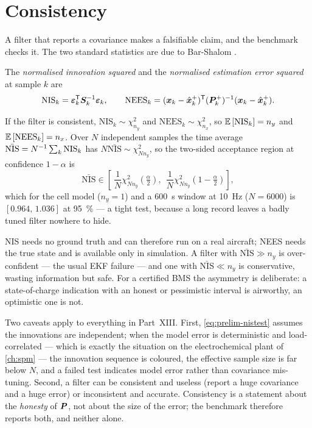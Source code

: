 \section{Consistency}
\label{sec:prelim-consistency}

A filter that reports a covariance makes a falsifiable claim, and the benchmark checks it. The
two standard statistics are due to Bar-Shalom \cite[\S 5.4]{barshalom2001}.

\begin{definition}\label{def:prelim-nis}
The \emph{normalised innovation squared} and the \emph{normalised estimation error squared} at
sample $k$ are
\begin{equation}
\mathrm{NIS}_k = \bm{\varepsilon}_k^{\mathsf{T}}\bm{S}_k^{-1}\bm{\varepsilon}_k, \qquad
\mathrm{NEES}_k = (\bm{x}_k-\hat{\bm{x}}^{+}_k)^{\mathsf{T}}(\bm{P}^{+}_k)^{-1}(\bm{x}_k-\hat{\bm{x}}^{+}_k).
\label{eq:prelim-nisnees}
\end{equation}
\end{definition}

If the filter is consistent, $\mathrm{NIS}_k\sim\chi^2_{n_y}$ and
$\mathrm{NEES}_k\sim\chi^2_{n_x}$, so $\mathbb{E}\left[\mathrm{NIS}_k\right]=n_y$ and $\mathbb{E}\left[\mathrm{NEES}_k\right]=n_x$. Over
$N$ independent samples the time average $\bar{\mathrm{NIS}} = N^{-1}\sum_k\mathrm{NIS}_k$ has
$N\bar{\mathrm{NIS}}\sim\chi^2_{N n_y}$, so the two-sided acceptance region at confidence
$1-\alpha$ is
\begin{equation}
\bar{\mathrm{NIS}} \in
 \left[\ \frac{1}{N}\chi^2_{Nn_y}\!\left(\tfrac{\alpha}{2}\right),\ \
 \frac{1}{N}\chi^2_{Nn_y}\!\left(1-\tfrac{\alpha}{2}\right)\right],
\label{eq:prelim-nistest}
\end{equation}
which for the cell model ($n_y=1$) and a \SI{600}{\second} window at \SI{10}{\hertz}
($N=6000$) is $[0.964,\,1.036]$ at \SI{95}{\percent} --- a tight test, because a long record
leaves a badly tuned filter nowhere to hide.

NIS needs no ground truth and can therefore run on a real aircraft; NEES needs the true state and
is available only in simulation. A filter with $\bar{\mathrm{NIS}}\gg n_y$ is over-confident ---
the usual EKF failure --- and one with $\bar{\mathrm{NIS}}\ll n_y$ is conservative, wasting
information but safe. For a certified BMS the asymmetry is deliberate: a state-of-charge
indication with an honest or pessimistic interval is airworthy, an optimistic one is not.

Two caveats apply to everything in Part~XIII. First, \eqref{eq:prelim-nistest} assumes the
innovations are independent; when the model error is deterministic and load-correlated --- which
is exactly the situation on the electrochemical plant of \cref{ch:spm} --- the innovation
sequence is coloured, the effective sample size is far below $N$, and a failed test indicates
model error rather than covariance mis-tuning. Second, a filter can be consistent and useless
(report a huge covariance and a huge error) or inconsistent and accurate. Consistency is a
statement about the \emph{honesty} of $\bm{P}$, not about the size of the error; the benchmark
therefore reports both, and neither alone.

